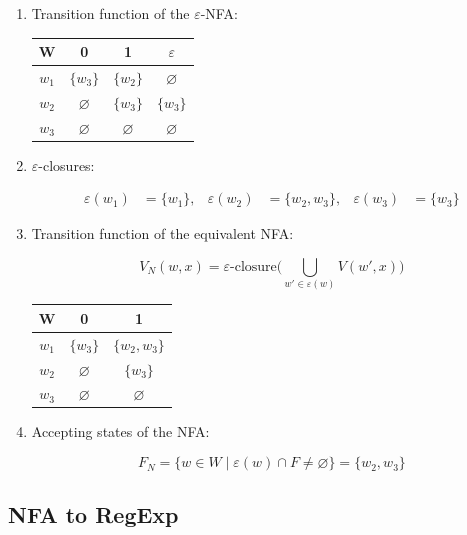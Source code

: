 \documentclass[12pt,a4paper,openany]{article}
\begin{document}
\begin{enumerate}

\item Transition function of the $\varepsilon$-NFA:

\begin{center}
\begin{tabular}{c|ccc}
\textbf{W} & \textbf{0} & \textbf{1} & \textbf{$\varepsilon$} \\
\hline
$w_1$ & $\{w_3\}$ & $\{w_2\}$ & $\varnothing$ \\
$w_2$ & $\varnothing$ & $\{w_3\}$ & $\{w_3\}$ \\
$w_3$ & $\varnothing$ & $\varnothing$ & $\varnothing$ \\
\end{tabular}
\end{center}

\item $\varepsilon$-closures:

\[
\begin{aligned}
\varepsilon(w_1) &= \{w_1\}, &
\varepsilon(w_2) &= \{w_2,w_3\}, &
\varepsilon(w_3) &= \{w_3\}
\end{aligned}
\]

\item Transition function of the equivalent NFA:

\[
V_N(w,x)
=
\varepsilon\text{-closure}
\Big(
\bigcup_{w' \in \varepsilon(w)} V(w',x)
\Big)
\]

\begin{center}
\begin{tabular}{c|cc}
\textbf{W} & \textbf{0} & \textbf{1} \\
\hline
$w_1$ & $\{w_3\}$ & $\{w_2,w_3\}$ \\
$w_2$ & $\varnothing$ & $\{w_3\}$ \\
$w_3$ & $\varnothing$ & $\varnothing$ \\
\end{tabular}
\end{center}

\item Accepting states of the NFA:

\[
F_N
=
\{ w \in W \mid \varepsilon(w) \cap F \neq \varnothing \}
=
\{w_2,w_3\}
\]

\end{enumerate}

\subsection{NFA to RegExp}
\end{document}
